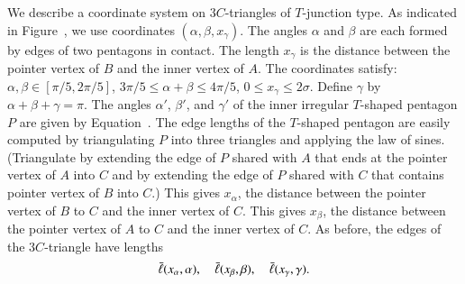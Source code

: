 We describe a coordinate system on $3C$-triangles of $T$-junction
type.  As indicated in Figure~, we use coordinates
$(\alpha,\beta,x_\gamma)$.  The angles $\alpha$ and $\beta$ are each
formed by edges of two pentagons in contact.  The length $x_\gamma$ is
the distance between the pointer vertex of $B$ and the inner vertex of
$A$.  The coordinates satisfy: $\alpha,\beta\in[\pi/5,2\pi/5]$,
$3\pi/5\le \alpha+\beta\le 4\pi/5$, $0\le x_\gamma\le 2\sigma$.
Define $\gamma$ by $\alpha+\beta+\gamma=\pi$.  The angles $\alpha'$,
$\beta'$, and $\gamma'$ of the inner irregular $T$-shaped pentagon $P$
are given by Equation~.  The edge lengths of the
$T$-shaped pentagon are easily computed by triangulating $P$ into
three triangles and applying the law of sines.  (Triangulate by
extending the edge of $P$ shared with $A$ that ends at the pointer
vertex of $A$ into $C$ and by extending the edge of $P$ shared with
$C$ that contains pointer vertex of $B$ into $C$.)  This gives
$x_\alpha$, the distance between the pointer vertex of $B$ to $C$ and
the inner vertex of $C$.  This gives $x_\beta$, the distance between
the pointer vertex of $A$ to $C$ and the inner vertex of $C$.  As
before, the edges of the $3C$-triangle have lengths
\[
\bar\ell(x_\alpha,\alpha),\quad \bar\ell(x_\beta,\beta),\quad \bar\ell(x_\gamma,\gamma).
\]




